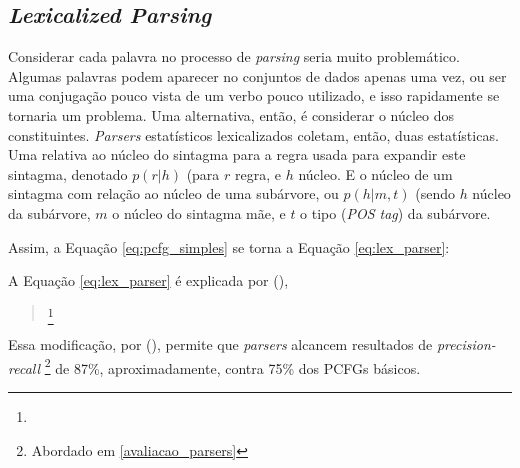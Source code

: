 \subsection{\textit{Lexicalized Parsing}}
\label{lexParsing}

Considerar cada palavra no processo de \textit{parsing} seria muito problemático. Algumas palavras podem aparecer no conjuntos de dados apenas uma vez, ou ser uma conjugação pouco vista de um verbo pouco utilizado, e isso rapidamente se tornaria um problema. Uma alternativa, então, é considerar o núcleo dos constituintes.  \textit{Parsers} estatísticos lexicalizados coletam, então, duas estatísticas. Uma relativa ao núcleo do sintagma para a regra usada para expandir este sintagma, denotado $p(r|h)$ (para $r$ regra, e $h$ núcleo. E o núcleo de um sintagma com relação ao núcleo de uma subárvore, ou $p(h|m,t)$ (sendo $h$ núcleo da subárvore, $m$ o núcleo do sintagma mãe, e $t$ o tipo (\textit{POS tag}) da subárvore. 

Assim, a Equação \ref{eq:pcfg_simples} se torna a Equação \ref{eq:lex_parser}:
\begin{center}
    
\end{center}
A Equação \ref{eq:lex_parser} é explicada por (\textit{}), 
\begin{quote}
    \footnote{}
\end{quote}

Essa modificação, por (\textit{}), permite que \textit{parsers} alcancem resultados de \textit{precision-recall}
\footnote{Abordado em \ref{avaliacao_parsers}}
de 87\%, aproximadamente, contra 75\% dos PCFGs básicos.